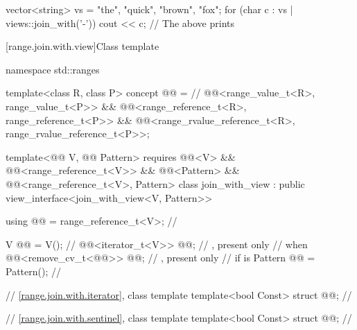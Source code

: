 \pnum
\begin{example}
\begin{codeblock}
vector<string> vs = {"the", "quick", "brown", "fox"};
for (char c : vs | views::join_with('-')) {
  cout << c;
}
// The above prints 
\end{codeblock}
\end{example}

[range.join.with.view]{Class template }

\begin{codeblock}
namespace std::ranges {
  template<class R, class P>
  concept @@ =            // \expos
      @@<range_value_t<R>, range_value_t<P>> &&
      @@<range_reference_t<R>, range_reference_t<P>> &&
      @@<range_rvalue_reference_t<R>, range_rvalue_reference_t<P>>;

  template<@@ V, @@ Pattern>
    requires @@<V> && @@<range_reference_t<V>>
          && @@<Pattern>
          && @@<range_reference_t<V>, Pattern>
  class join_with_view : public view_interface<join_with_view<V, Pattern>> {
    using @@ = range_reference_t<V>;                  // \expos

    V @@ = V();                                          // \expos
    @@<iterator_t<V>> @@;         // \expos, present only
                                                            // when 
    @@<remove_cv_t<@@>> @@;   // \expos, present only
                                                            // if  is 
    Pattern @@ = Pattern();                           // \expos

    // \ref{range.join.with.iterator}, class template 
    template<bool Const> struct @@;                   // \expos

    // \ref{range.join.with.sentinel}, class template 
    template<bool Const> struct @@;                   // \expos

}}
\end{codeblock}
